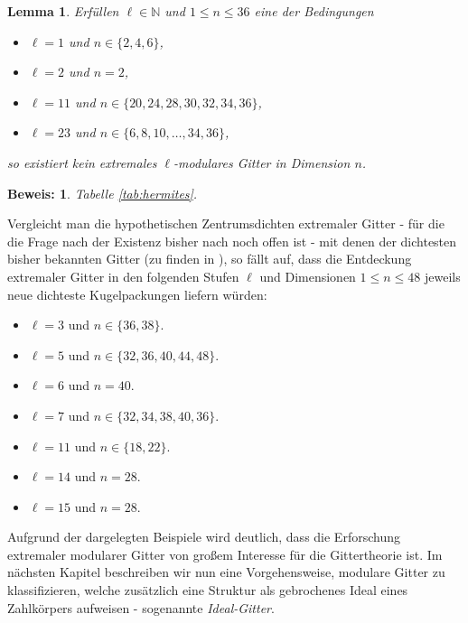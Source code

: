 \documentclass[12pt,a4paper,halfparskip,headsepline,bibtotocnumbered]{scrreprt}
\theoremstyle{nummermitklammern}
\newtheorem{lemma}[defsatzusw]{Lemma}
\theoremstyle{nonumberbreak}
\newtheorem{beweis}{Beweis:}
\newcommand{\N}{\mathbb{N}}
\begin{document}
\begin{framed}
	\begin{lemma}
		Erfüllen $\ell \in \N$ und $1 \leq n \leq 36$ eine der Bedingungen
		\begin{itemize}
			\item $\ell = 1$ und $n \in \lbrace 2,4,6 \rbrace$,
			\item $\ell = 2$ und $n = 2$,
			\item $\ell = 11$ und $n \in \lbrace 20, 24, 28, 30, 32, 34, 36 \rbrace$,
			\item $\ell = 23$ und $n \in \lbrace 6, 8, 10, \dots, 34, 36 \rbrace$,
		\end{itemize}
		so existiert kein extremales $\ell$-modulares Gitter in Dimension $n$.
	\end{lemma}
\end{framed}
\begin{beweis}
	Tabelle \eqref{tab:hermites}.
\end{beweis}

Vergleicht man die hypothetischen Zentrumsdichten extremaler Gitter - für die die Frage nach der Existenz bisher nach \cite{juergens} noch offen ist - mit denen der dichtesten bisher bekannten Gitter (zu finden in \cite{database}), so fällt auf, dass die Entdeckung extremaler Gitter in den folgenden Stufen $\ell$ und Dimensionen $1 \leq n\leq 48$ jeweils neue dichteste Kugelpackungen liefern würden:
\begin{itemize}
	\item $\ell = 3$ und $n \in \lbrace 36,38 \rbrace$.
	\item $\ell = 5$ und $n \in \lbrace 32, 36, 40, 44, 48 \rbrace$.
	\item $\ell = 6$ und $n = 40$.
	\item $\ell = 7$ und $n \in \lbrace 32, 34, 38, 40, 36 \rbrace$.
	\item $\ell = 11$ und $n \in \lbrace 18, 22 \rbrace$.
	\item $\ell = 14$ und $n = 28$.
	\item $\ell = 15$ und $n = 28$.
\end{itemize}
Aufgrund der dargelegten Beispiele wird deutlich, dass die Erforschung extremaler modularer Gitter von großem Interesse für die Gittertheorie ist. Im nächsten Kapitel beschreiben wir nun eine Vorgehensweise, modulare Gitter zu klassifizieren, welche zusätzlich eine Struktur als gebrochenes Ideal eines Zahlkörpers aufweisen - sogenannte \textit{Ideal-Gitter}.

\end{document}
